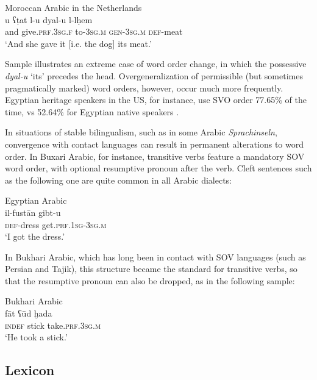 \documentclass[output=paper]{langsci/langscibook}
\begin{document}
\ea\label{ex:key:neth}
{Moroccan Arabic in the Netherlands \citep[105]{Boumans2001}}\\
\gll u ʕṭat l-u dyal-u l-lḥem\\
     and give.\textsc{prf.3sg.f} to-\textsc{3sg.m} \textsc{gen-3sg.m} \textsc{def}{}-meat\\
\glt `And she gave it [i.e. the dog] its meat.'
\z

Sample  illustrates an extreme case of word order change, in which the possessive \textit{dyal-u} ‘its’ precedes the head. Overgeneralization of permissible (but sometimes pragmatically marked) word orders, however, occur much more frequently. Egyptian heritage speakers in the US, for instance, use SVO order 77.65\% of the time, vs 52.64\% for Egyptian native speakers \citep[280–281]{AlbiriniSaadah2011}.

In situations of stable bilingualism, such as in some Arabic \textit{Sprachinseln}, convergence with contact languages can result in permanent alterations to word order. In Buxari Arabic, for instance, transitive verbs feature a mandatory SOV word order, with optional resumptive pronoun after the verb. Cleft sentences such as the following one are quite common in all Arabic dialects:

\ea\label{ex:key:}
{Egyptian Arabic \citep[145]{Ratcliffe2005}}\\
\gll il-fustān  gibt-u\\
     \textsc{def-}dress  get.\textsc{prf.1sg-3sg.m}\\
\glt ‘I got the dress.’
\z

In Bukhari Arabic, which has long been in contact with SOV languages (such as Persian and Tajik), this structure became the standard for transitive verbs, so that the resumptive pronoun can also be dropped, as in the following sample:

\ea\label{ex:key:}
{Bukhari Arabic  \citep[144]{Ratcliffe2005}}\\
\gll   fāt ʕūd ḫada\\
       \textsc{indef} stick take\textsc{.prf.3sg.m}\\
\glt ‘He took a stick.’
\z


 
 \subsection{Lexicon}
\end{document}
